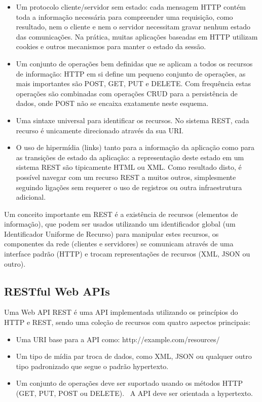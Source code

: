 \begin{itemize}
	\item Um protocolo cliente/servidor sem estado: cada mensagem HTTP contém toda a informação necessária para compreender uma requisição, como resultado, nem o cliente e nem o servidor necessitam gravar nenhum estado das comunicações. Na prática, muitas aplicações baseadas em HTTP utilizam cookies e outros mecanismos para manter o estado da sessão.
	\item	Um conjunto de operações bem definidas que se aplicam a todos os recursos de informação: HTTP em si define um pequeno conjunto de operações, as mais importantes são POST, GET, PUT e DELETE. Com frequência estas operações são combinadas com operações CRUD para a persistência de dados, onde POST não se encaixa exatamente neste esquema.
	\item	Uma sintaxe universal para identificar os recursos. No sistema REST, cada recurso é unicamente direcionado através da sua URI.
	\item	O uso de hipermídia (links) tanto para a informação da aplicação como para as transições de estado da aplicação: a representação deste estado em um sistema REST são tipicamente HTML ou XML. Como resultado disto, é possível navegar com um recurso REST a muitos outros, simplesmente seguindo ligações sem requerer o uso de registros ou outra infraestrutura adicional.
\end{itemize}

Um conceito importante em REST é a existência de recursos (elementos de informação), que podem ser usados utilizando um identificador global (um Identificador Uniforme de Recurso) para manipular estes recursos, os componentes da rede (clientes e servidores) se comunicam através de uma interface padrão (HTTP) e trocam representações de recursos (XML, JSON ou outro).

\subsection {RESTful Web APIs}

Uma Web API REST é uma API implementada utilizando os princípios do HTTP e REST, sendo uma coleção de recursos com quatro aspectos principais:

\begin{itemize}
	\item Uma URI base para a API como: http://example.com/resources/
	\item Um tipo de mídia par troca de dados, como XML, JSON ou qualquer outro tipo padronizado que segue o padrão hypertexto.
	\item Um conjunto de operações deve ser suportado usando os métodos HTTP (GET, PUT, POST ou DELETE).
	\ A API deve ser orientada a hypertexto.
\end{itemize}

